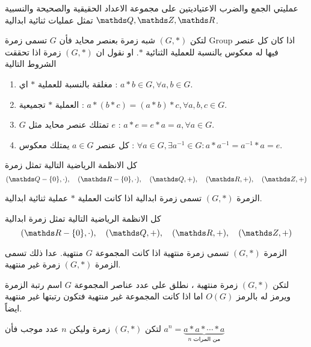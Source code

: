 \begin{example}
	عمليتي الجمع والضرب الاعتياديتين على مجموعة الاعداد الحقيقية والصحيحة والنسبية $\Q, \Z, \R$ تمثل عمليات ثنائية ابدالية. 
\end{example}
\newpage
\begin{definition}[( الزمرة )]
	لتكن $(G, *)$ شبه زمرة بعنصر محايد فأن $G$ تسمى زمرة Group اذا كان كل عنصر فيها له معكوس بالنسبة للعملية الثنائية $*$. او نقول ان $(G, *)$ زمرة اذا تحققت الشروط التالية
	\begin{enumerate}[label=$\boxed{\arabic*}$]
		\item مغلقة بالنسبة للعملية $*$ اي : $a*b \in G , \forall a, b\in G$.
		\item العملية $*$ تجميعية : $a*(b*c) = (a*b)*c , \forall a, b,c\in G$.
		\item $G$ تمتلك عنصر محايد مثل $e$ : $a*e =e*a=a, \forall a\in G$.
		\item كل عنصر $a\in G$ يمتلك معكوس : $\forall a\in G, \exists a^{-1}\in G : a*a^{-1}=a^{-1}*a=e$.
	\end{enumerate}    
\end{definition}

\begin{example}
	كل الانظمة الرياضية التالية تمثل زمرة
	\[
	(\Q-\{0\}, \cdot), \quad(\R-\{0\}, \cdot),\quad (\Q, +) ,\quad (\R, +) ,\quad (\Z, +)
	\]
\end{example}

\begin{definition}[]
	الزمرة $(G, *)$ تسمى زمرة ابدالية اذا كانت العملية $*$ عملية ثنائية ابدالية.
\end{definition}

\begin{example}
	كل الانظمة الرياضية التالية تمثل زمرة ابدالية
	\[
	(\R-\{0\}, \cdot),\quad (\Q, +) ,\quad (\R, +) ,\quad (\Z, +)
	\]
\end{example}

\begin{definition}[]
	الزمرة $(G, * )$ تسمى زمرة منتهية اذا كانت المجموعة $G$ منتهية. عدا ذلك تسمى الزمرة $(G, *)$ زمرة غير منتهية. 
\end{definition}

\begin{definition}[]
	لتكن $(G, *)$ زمرة منتهية ، نطلق على عدد عناصر المجموعة $G$ اسم رتبة الزمرة ويرمز له بالرمز $O(G)$ اما اذا كانت المجموعة غير منتهية فتكون رتبتها غير منتهية ايضاً.
\end{definition}

\begin{definition}[]
	لتكن $(G, *)$ زمرة وليكن $n$ عدد موجب فأن 
	$a^n =\underbrace{a*a*\cdots*a}_{\text{$n$ من المرات}}$ 
\end{definition}

